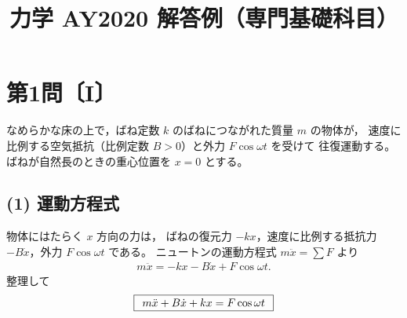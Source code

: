 \documentclass[11pt,a4paper]{article}
\title{力学 AY2020 解答例（専門基礎科目）}
\author{}
\date{}
\begin{document}
\maketitle

\section*{第1問〔I〕}

なめらかな床の上で，ばね定数 $k$ のばねにつながれた質量 $m$ の物体が，
速度に比例する空気抵抗（比例定数 $B>0$）と外力 $F\cos\omega t$ を受けて
往復運動する。ばねが自然長のときの重心位置を $x=0$ とする。

\subsection*{(1) 運動方程式}
物体にはたらく $x$ 方向の力は，
ばねの復元力 $-kx$，速度に比例する抵抗力 $-B\dot{x}$，外力 $F\cos\omega t$ である。
ニュートンの運動方程式 $m\ddot{x}=\sum F$ より
\begin{align*}
  m\ddot{x} = -kx - B\dot{x} + F\cos\omega t.
\end{align*}
整理して
\[
  \boxed{\,\;m\ddot{x}+B\dot{x}+kx = F\cos\omega t\;\,}
\]
\end{document}
